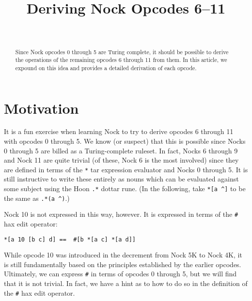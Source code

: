 \documentclass[twoside]{article}
\title{Deriving Nock Opcodes 6–11}
\author{\authorname~\authorpatp}
\date{}
\begin{document}
\maketitle
\thispagestyle{firststyle}

\begin{abstract}
  Since Nock opcodes 0 through 5 are Turing complete, it should be possible to derive the operations of the remaining opcodes 6 through 11 from them.  In this article, we expound on this idea and provides a detailed derivation of each opcode.
\end{abstract}

\setcounter{page}{46}

\tableofcontents

\section{Motivation}

It is a fun exercise when learning Nock to try to derive opcodes 6 through 11 with opcodes 0 through 5. We know (or suspect) that this is possible since Nocks 0 through 5 are billed as a Turing-complete ruleset. In fact, Nocks 6 through 9 and Nock 11 are quite trivial (of these, Nock 6 is the most involved) since they are defined in terms of the \lstinline[style=inlinecode]{*} tar expression evaluator and Nocks 0 through 5. It is still instructive to write these entirely as nouns which can be evaluated against some subject using the Hoon \lstinline[style=inlinecode]{.*} dottar rune. (In the following, take \lstinline[style=inlinecode]{*[a ^]} to be the same as \lstinline[style=inlinecode]{.*(a ^)}.)

Nock 10 is not expressed in this way, however. It is expressed in terms of the \lstinline[style=inlinecode]{#} hax edit operator:

\begin{lstlisting}[style=listingcode]
*[a 10 [b c] d] ==  #[b *[a c] *[a d]]
\end{lstlisting}

\noindent
While opcode 10 was introduced in the decrement from Nock 5K to Nock 4K, it is still fundamentally based on the principles established by the earlier opcodes.  Ultimately, we can express \lstinline[style=inlinecode]{#} in terms of opcodes 0 through 5, but we will find that it is not trivial. In fact, we have a hint as to how to do so in the definition of the \lstinline[style=inlinecode]{#} hax edit operator.
\end{document}
